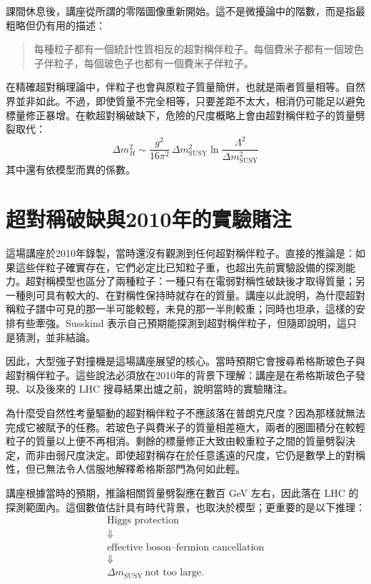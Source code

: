 課間休息後，講座從所謂的零階圖像重新開始。這不是微擾論中的階數，而是指最粗略但仍有用的描述：
\begin{quote}
每種粒子都有一個統計性質相反的超對稱伴粒子。每個費米子都有一個玻色子伴粒子，每個玻色子也都有一個費米子伴粒子。
\end{quote}
在精確超對稱理論中，伴粒子也會與原粒子質量簡併，也就是兩者質量相等。自然界並非如此。不過，即使質量不完全相等，只要差距不太大，相消仍可能足以避免標量修正暴增。在軟超對稱破缺下，危險的尺度概略上會由超對稱伴粒子的質量劈裂取代：
\begin{equation}
\Delta m_H^2\sim
\frac{g^2}{16\pi^2}\,\Delta m_{\mathrm{SUSY}}^2
\ln\!\frac{\Lambda^2}{\Delta m_{\mathrm{SUSY}}^2}
\end{equation}
其中還有依模型而異的係數。

\section{超對稱破缺與2010年的實驗賭注}

這場講座於2010年錄製，當時還沒有觀測到任何超對稱伴粒子。直接的推論是：如果這些伴粒子確實存在，它們必定比已知粒子重，也超出先前實驗設備的探測能力。超對稱模型也區分了兩種粒子：一種只有在電弱對稱性破缺後才取得質量；另一種則可具有較大的、在對稱性保持時就存在的質量。講座以此說明，為什麼超對稱粒子譜中可見的那一半可能較輕，未見的那一半則較重；同時也坦承，這樣的安排有些牽強。Susskind 表示自己預期能探測到超對稱伴粒子，但隨即說明，這只是猜測，並非結論。

因此，大型強子對撞機是這場講座展望的核心。當時預期它會搜尋希格斯玻色子與超對稱伴粒子。這些說法必須放在2010年的背景下理解：講座是在希格斯玻色子發現、以及後來的 LHC 搜尋結果出爐之前，說明當時的實驗賭注。

為什麼受自然性考量驅動的超對稱伴粒子不應該落在普朗克尺度？因為那樣就無法完成它被賦予的任務。若玻色子與費米子的質量相差極大，兩者的圈圖積分在較輕粒子的質量以上便不再相消。剩餘的標量修正大致由較重粒子之間的質量劈裂決定，而非由弱尺度決定。即使超對稱存在於任意遙遠的尺度，它仍是數學上的對稱性，但已無法令人信服地解釋希格斯部門為何如此輕。

講座根據當時的預期，推論相關質量劈裂應在數百 GeV 左右，因此落在 LHC 的探測範圍內。這個數值估計具有時代背景，也取決於模型；更重要的是以下推理：
\begin{equation}
\begin{gathered}
\text{Higgs protection}\\
\Downarrow\\
\text{effective boson--fermion cancellation}\\
\Downarrow\\
\Delta m_{\mathrm{SUSY}}\ \text{not too large}.
\end{gathered}
\end{equation}

